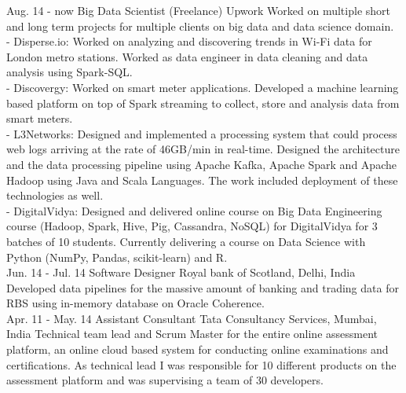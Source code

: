 \documentclass[]{cv-class}
\begin{document}
\begin{entrylist}

\entry
    {Aug. 14 - now}
    {Big Data Scientist (Freelance)}
    {Upwork}
    { Worked on multiple short and long term projects for multiple clients on big data and data science domain.\\
			- Disperse.io: Worked on analyzing and discovering trends in Wi-Fi data for London metro stations. Worked as data engineer in data cleaning and data analysis using Spark-SQL.\\
			- Discovergy: Worked on smart meter applications. Developed a machine learning based platform on top of Spark streaming to collect, store and analysis data from smart meters. \\
			- L3Networks: Designed and implemented a processing system that could process web logs arriving at the rate of 46GB/min in real-time. Designed the architecture and the data processing pipeline using Apache Kafka, Apache Spark and Apache Hadoop using Java and Scala Languages. The work included deployment of these technologies as well.\\
			- DigitalVidya: Designed and delivered online course on Big Data Engineering course (Hadoop, Spark, Hive, Pig, Cassandra, NoSQL) for DigitalVidya for 3 batches of 10 students. Currently delivering a course on Data Science with Python (NumPy, Pandas, scikit-learn) and R.\\
			}		
 \entry
    {Jun. 14 - Jul. 14}
    {Software Designer}
    {Royal bank of Scotland, Delhi, India}
    {Developed data pipelines for the massive amount of banking and trading data for RBS using in-memory database on Oracle Coherence. \\}
  \entry
    {Apr. 11 - May. 14}
    {Assistant Consultant}
    {Tata Consultancy Services, Mumbai, India}
    {Technical team lead and Scrum Master for the entire online assessment platform, an online cloud based system for conducting online examinations and certifications. As technical lead I was responsible for 10 different products on the assessment platform and was supervising a team of 30 developers.\\
}
\end{entrylist}
\end{document}
